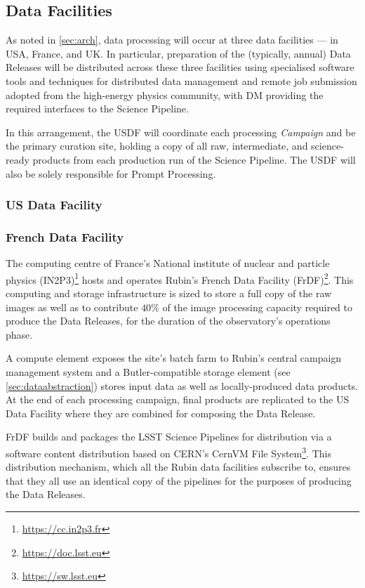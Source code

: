 \subsection{Data Facilities} \label{sec:datafacilities}

As noted in \autoref{sec:arch}, data processing will occur at three data facilities --- in USA, France, and UK. In particular, preparation of the (typically, annual) Data Releases will be distributed across these three facilities using specialised software tools and techniques for distributed data management and remote job submission adopted from the high-energy physics community, with DM providing the required interfaces to the Science Pipeline.

In this arrangement, the USDF will coordinate each processing {\em Campaign} and be the primary curation site, holding a copy of all raw, intermediate, and science-ready products from each production run of the Science Pipeline. The USDF will also be solely responsible for Prompt Processing.

\subsubsection{US Data Facility} \label{sec:usdf}

\subsubsection{French Data Facility} \label{sec:frdf}

The computing centre of France's National institute of nuclear and particle physics (IN2P3)\footnote{\url{https://cc.in2p3.fr}} hosts and operates Rubin's French Data Facility (FrDF)\footnote{\url{https://doc.lsst.eu}}. This computing and storage infrastructure is sized to store a full copy of the raw images as well as to contribute $40\%$ of the image processing capacity required to produce the Data Releases, for the duration of the observatory's operations phase.

A compute element exposes the site's batch farm to Rubin's central campaign management system and a Butler-compatible storage element (see \autoref{sec:dataabstraction}) stores input data as well as locally-produced data products. At the end of each processing campaign, final products are replicated to the US Data Facility where they are combined for composing the Data Release.

FrDF builds and packages the LSST Science Pipelines for distribution via a software content distribution based on CERN's CernVM File System\footnote{\url{https://sw.lsst.eu}}. This distribution mechanism, which all the Rubin data facilities subscribe to, ensures that they all use an identical copy of the pipelines for the purposes of producing the Data Releases.

